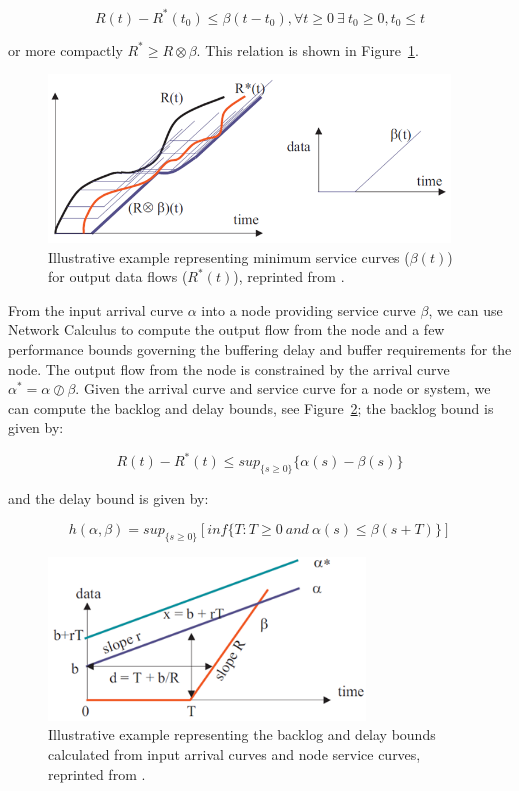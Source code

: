 \begin{equation}
  R(t)-R^*(t_0)\leq \beta(t-t_0), \forall t\geq 0\ \exists\ t_0\geq
  0,t_0\leq t
\end{equation}

or more compactly $R^*\geq R\otimes\beta$.  This relation is shown in
Figure~\ref{fig:nc_service_curve}.

\begin{figure}[htb]
  \centering
  \includegraphics[width=0.95\textwidth]{figs/nc_service_curve.png}
  \caption{Illustrative example representing minimum service curves
    ($\beta(t)$) for output data flows ($R^*(t)$), reprinted from
    \cite{NCBook}.}
  \label{fig:nc_service_curve}
\end{figure}

From the input arrival curve $\alpha$ into a node providing service
curve $\beta$, we can use Network Calculus to compute the output flow
from the node and a few performance bounds governing the buffering
delay and buffer requirements for the node.  The output flow from the
node is constrained by the arrival curve $\alpha^* =
\alpha\oslash\beta$.  Given the arrival curve and service curve for a
node or system, we can compute the backlog and delay bounds, see
Figure~\ref{fig:nc_bounds}; the backlog bound is given by:

\begin{equation}
  R(t)-R^*(t)\leq sup_{\{s\geq 0\}}\{\alpha(s)-\beta(s)\}
\end{equation}

and the delay bound is given by: 

\begin{equation}
  h(\alpha,\beta)=sup_{\{s\geq0\}}[inf\{T:T\geq0\ and\ \alpha(s)\leq\beta(s+T)\}]
\end{equation}

\begin{figure}[htb]
  \centering
  \includegraphics[width=0.75\textwidth]{figs/nc_bounds.png}
  \caption{Illustrative example representing the backlog and delay
    bounds calculated from input arrival curves and node service
    curves, reprinted from \cite{NCBook}.}
  \label{fig:nc_bounds}
\end{figure}


